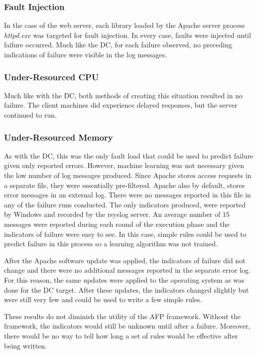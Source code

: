 \subsubsection{Fault Injection}
In the case of the web server, each library loaded by the Apache server process
\emph{httpd.exe} was targeted for fault injection.  In every case, faults were
injected until failure occurred.  Much like the \ac{DC}, for each failure
observed, no preceding indications of failure were visible in the log messages.

\subsubsection{Under-Resourced CPU}
Much like with the \ac{DC}, both methods of creating this situation resulted in
no failure.  The client machines did experience delayed responses, but the
server continued to run.

\subsubsection{Under-Resourced Memory}
As with the \ac{DC}, this was the only fault load that could be used to predict
failure given only reported errors.  However, machine learning was not
necessary given the low number of log messages produced.  Since Apache stores
access requests in a separate file, they were essentially pre-filtered.  Apache
also by default, stores error messages in an external log.  There were no
messages reported in this file in any of the failure runs conducted.  The only
indicators produced, were reported by Windows and recorded by the rsyslog
server.  An average number of $15$ messages were reported during each round of
the execution phase and the indicators of failure were easy to see.  In this
case, simple rules could be used to predict failure in this process so a
learning algorithm was not trained.  

After the Apache software update was applied, the indicators of failure did not
change and there were no additional messages reported in the separate error
log.  For this reason, the same updates were applied to the operating system as
was done for the \ac{DC} target.  After these updates, the indicators changed
slightly but were still very few and could be used to write a few simple rules.

These results do not diminish the utility of the \ac{AFP} framework.  Without
the framework, the indicators would still be unknown until after a failure.
Moreover, there would be no way to tell how long a set of rules would be
effective after being written.

